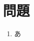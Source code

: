 \documentclass[platex,dvipdfmx]{jlreq}
\begin{document}
\section*{問題}
\begin{enumerate}[(1)   ]
  \item あ
\end{enumerate}
\end{document}
